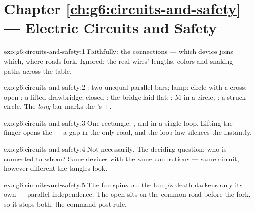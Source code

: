 \section*{Chapter \ref{ch:g6:circuits-and-safety} --- Electric Circuits and Safety}

\begin{solution}{exo:g6:circuits-and-safety:1}
Faithfully: the connections --- which device joins which, where
roads fork. Ignored: the real wires' lengths, colors and snaking
paths across the table.
\end{solution}

\begin{solution}{exo:g6:circuits-and-safety:2}
: two unequal parallel bars; lamp: circle with a cross;
open : a lifted drawbridge; closed : the bridge laid
flat; : M in a circle; : a struck circle. The
\emph{long} bar marks the 's $+$.
\end{solution}

\begin{solution}{exo:g6:circuits-and-safety:3}
One rectangle: ,  and  in a single loop.
Lifting the finger opens the  --- a gap in the only road,
and the loop law silences the  instantly.
\end{solution}

\begin{solution}{exo:g6:circuits-and-safety:4}
Not necessarily. The deciding question: who is connected to whom?
Same devices with the same connections --- same circuit, however
different the tangles look.
\end{solution}

\begin{solution}{exo:g6:circuits-and-safety:5}
The fan spins on: the lamp's death darkens only its own  ---
parallel independence. The open  sits on the common road
before the fork, so it stops both: the command-post rule.
\end{solution}

